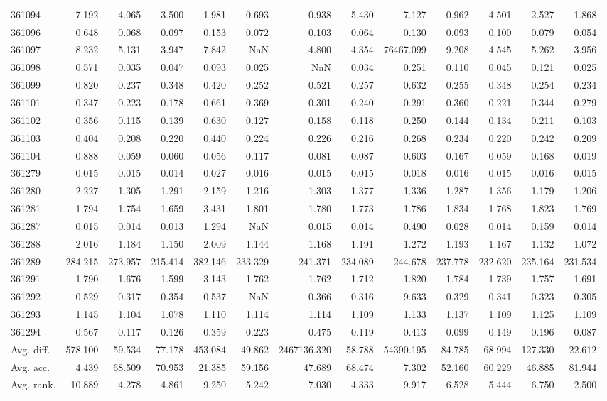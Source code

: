 \begin{tabular}{lrrrrrrrrrrrr}
361094 & 7.192 & 4.065 & 3.500 & 1.981 & 0.693 & 0.938 & 5.430 & 7.127 & 0.962 & 4.501 & 2.527 & 1.868 \\
361096 & 0.648 & 0.068 & 0.097 & 0.153 & 0.072 & 0.103 & 0.064 & 0.130 & 0.093 & 0.100 & 0.079 & 0.054 \\
361097 & 8.232 & 5.131 & 3.947 & 7.842 & NaN & 4.800 & 4.354 & 76467.099 & 9.208 & 4.545 & 5.262 & 3.956 \\
361098 & 0.571 & 0.035 & 0.047 & 0.093 & 0.025 & NaN & 0.034 & 0.251 & 0.110 & 0.045 & 0.121 & 0.025 \\
361099 & 0.820 & 0.237 & 0.348 & 0.420 & 0.252 & 0.521 & 0.257 & 0.632 & 0.255 & 0.348 & 0.254 & 0.234 \\
361101 & 0.347 & 0.223 & 0.178 & 0.661 & 0.369 & 0.301 & 0.240 & 0.291 & 0.360 & 0.221 & 0.344 & 0.279 \\
361102 & 0.356 & 0.115 & 0.139 & 0.630 & 0.127 & 0.158 & 0.118 & 0.250 & 0.144 & 0.134 & 0.211 & 0.103 \\
361103 & 0.404 & 0.208 & 0.220 & 0.440 & 0.224 & 0.226 & 0.216 & 0.268 & 0.234 & 0.220 & 0.242 & 0.209 \\
361104 & 0.888 & 0.059 & 0.060 & 0.056 & 0.117 & 0.081 & 0.087 & 0.603 & 0.167 & 0.059 & 0.168 & 0.019 \\
361279 & 0.015 & 0.015 & 0.014 & 0.027 & 0.016 & 0.015 & 0.015 & 0.018 & 0.016 & 0.015 & 0.016 & 0.015 \\
361280 & 2.227 & 1.305 & 1.291 & 2.159 & 1.216 & 1.303 & 1.377 & 1.336 & 1.287 & 1.356 & 1.179 & 1.206 \\
361281 & 1.794 & 1.754 & 1.659 & 3.431 & 1.801 & 1.780 & 1.773 & 1.786 & 1.834 & 1.768 & 1.823 & 1.769 \\
361287 & 0.015 & 0.014 & 0.013 & 1.294 & NaN & 0.015 & 0.014 & 0.490 & 0.028 & 0.014 & 0.159 & 0.014 \\
361288 & 2.016 & 1.184 & 1.150 & 2.009 & 1.144 & 1.168 & 1.191 & 1.272 & 1.193 & 1.167 & 1.132 & 1.072 \\
361289 & 284.215 & 273.957 & 215.414 & 382.146 & 233.329 & 241.371 & 234.089 & 244.678 & 237.778 & 232.620 & 235.164 & 231.534 \\
361291 & 1.790 & 1.676 & 1.599 & 3.143 & 1.762 & 1.762 & 1.712 & 1.820 & 1.784 & 1.739 & 1.757 & 1.691 \\
361292 & 0.529 & 0.317 & 0.354 & 0.537 & NaN & 0.366 & 0.316 & 9.633 & 0.329 & 0.341 & 0.323 & 0.305 \\
361293 & 1.145 & 1.104 & 1.078 & 1.110 & 1.114 & 1.114 & 1.109 & 1.133 & 1.137 & 1.109 & 1.125 & 1.109 \\
361294 & 0.567 & 0.117 & 0.126 & 0.359 & 0.223 & 0.475 & 0.119 & 0.413 & 0.099 & 0.149 & 0.196 & 0.087 \\
Avg. diff. & 578.100 & 59.534 & 77.178 & 453.084 & 49.862 & 2467136.320 & 58.788 & 54390.195 & 84.785 & 68.994 & 127.330 & 22.612 \\
Avg. acc. & 4.439 & 68.509 & 70.953 & 21.385 & 59.156 & 47.689 & 68.474 & 7.302 & 52.160 & 60.229 & 46.885 & 81.944 \\
Avg. rank. & 10.889 & 4.278 & 4.861 & 9.250 & 5.242 & 7.030 & 4.333 & 9.917 & 6.528 & 5.444 & 6.750 & 2.500 \\
\bottomrule
\end{tabular}
